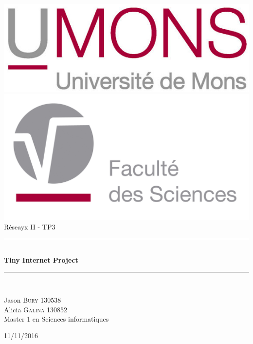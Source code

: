 \begin{titlepage}
\begin{center}
\includegraphics[scale=1.50]{UMONS.jpg}\\[0.4cm]
\includegraphics[scale=0.30]{FS_Logo.jpg}\\[3cm]
{\huge Réseayx II - TP3}\\
\vspace{0.9mm}
\rule{9.5cm}{0.5mm}\\[0.5cm]
{\huge \bfseries Tiny Internet Project}\\[0.2cm]
\rule{9.5cm}{0.5mm}\\[7cm]
      \begin{flushleft} \large
        Jason \textsc{Bury} 130538\\
        Alicia \textsc{Galina} 130852\\
        Master 1 en Sciences informatiques\\
      \end{flushleft}
   \vfill
  {\large 11/11/2016}
\end{center}
\end{titlepage}